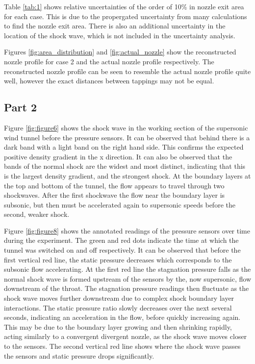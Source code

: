 \documentclass{article}
\begin{document}
Table \ref{tab:1} shows relative uncertainties of the order of 10\% in nozzle exit area for each case.
This is due to the propergated uncertainty from many calculations to find the nozzle exit area.
There is also an additional uncertainty in the location of the shock wave, which is not included in the uncertainty analysis.

Figures \ref{fig:area_distribution} and \ref{fig:actual_nozzle} show the reconstructed nozzle profile for case 2 and the actual nozzle profile respectively.
The reconstructed nozzle profile can be seen to resemble the actual nozzle profile quite well, however the exact distances between tappings may not be equal.


\subsection{Part 2}

Figure \ref{fig:figure6} shows the shock wave in the working section of the supersonic wind tunnel before the pressure sensors.
It can be observed that behind there is a dark band with a light band on the right hand side.
This confirms the expected positive density gradient in the x direction.
It can also be observed that the bands of the normal shock are the widest and most distinct, indicating that this is the largest density gradient, and the strongest shock.
At the boundary layers at the top and bottom of the tunnel, the flow appears to travel through two shockwaves.
After the first shockwave the flow near the boundary layer is subsonic, but then must be accelerated again to supersonic speeds before the second, weaker shock.

Figure \ref{fig:figure8} shows the annotated readings of the pressure sensors over time during the experiment.
The green and red dots indicate the time at which the tunnel was switched on and off respectively.
It can be observed that before the first vertical red line, the static pressure decreases which corresponds to the subsonic flow accelerating.
At the first red line the stagnation pressure falls as the normal shock wave is formed upstream of the sensors by the, now supersonic, flow downstream of the throat.
The stagnation pressure readings then fluctuate as the shock wave moves further downstream due to complex shock boundary layer interactions.
The static pressure ratio slowly decreases over the next several seconds, indicating an acceleration in the flow, before quickly increasing again.
This may be due to the boundary layer growing and then shrinking rapidly, acting similarly to a convergent divergent nozzle, as the shock wave moves closer to the sensors.
The second vertical red line shows where the shock wave passes the sensors and static pressure drops significantly.
\end{document}
